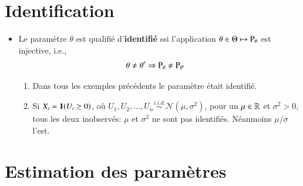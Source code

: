\section{Identification}
\frame{\sectionpage}

\begin{frame}
    [allowframebreaks]{\sectionpage}
    \begin{itemize}
        \item Le paramètre $\theta$ est qualifié d'\textbf{identifié} ssi l'application 
        $\theta\in \Theta\mapsto \operatorname{P}_\theta$ est injective, i.e., \begin{align*}
            \theta\neq \theta^\prime &\Rightarrow\operatorname{P}_{\theta} \neq \operatorname{P}_{\theta^\prime}
        \end{align*}
        \begin{enumerate}
            \item Dans tous les exemples précédents le paramètre était identifié.
            \item Si $X_i = \mathbf{1}(U_i \geq 0)$, où 
            $U_1, U_2, \ldots, U_n \overset{i.i.d.}{\sim}\mathcal{N}(\mu, \sigma^2)$, pour un $\mu \in \mathbb{R}$ 
            et $\sigma^2 >0$, tous les deux inobservés: $\mu$ et $\sigma^2$ ne sont pas identifiés. 
            Néanmoins $\mu/\sigma$ l'est.
        \end{enumerate}
    \end{itemize}
\end{frame}

\section{Estimation des paramètres}
\frame{\sectionpage}

